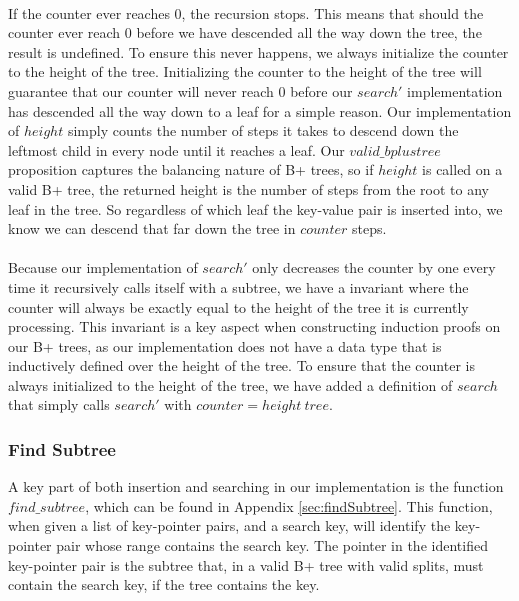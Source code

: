 \paragraph{}
If the counter ever reaches $0$, the recursion stops. This means that should the counter ever reach $0$ before we have descended all the way down the tree, the result is undefined. To ensure this never happens, we always initialize the counter to the height of the tree. Initializing the counter to the height of the tree will guarantee that our counter will never reach $0$ before our $search'$ implementation has descended all the way down to a leaf for a simple reason. Our implementation of $height$ simply counts the number of steps it takes to descend down the leftmost child in every node until it reaches a leaf. Our $valid\_bplustree$ proposition captures the balancing nature of B+ trees, so if $height$ is called on a valid B+ tree, the returned height is the number of steps from the root to any leaf in the tree. So regardless of which leaf the key-value pair is inserted into, we know we can descend that far down the tree in $counter$ steps. 
\paragraph{}
Because our implementation of $search'$ only decreases the counter by one every time it recursively calls itself with a subtree, we have a invariant where the counter will always be exactly equal to the height of the tree it is currently processing. This invariant is a key aspect when constructing induction proofs on our B+ trees, as our implementation does not have a data type that is inductively defined over the height of the tree. To ensure that the counter is always initialized to the height of the tree, we have added a definition of $search$ that simply calls $search'$ with $counter = height~tree$.

\subsubsection{Find Subtree}
A key part of both insertion and searching in our implementation is the function $find\_subtree$, which can be found in Appendix \ref{sec:findSubtree}. This function, when given a list of key-pointer pairs, and a search key, will identify the key-pointer pair whose range contains the search key. The pointer in the identified key-pointer pair is the subtree that, in a valid B+ tree with valid splits, must contain the search key, if the tree contains the key.

